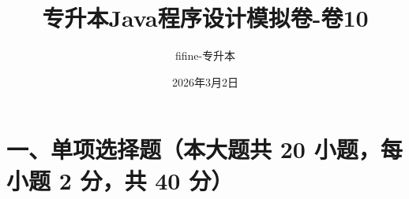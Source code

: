 \documentclass[12pt, a4paper]{ctexart}
\title{\textcolor{myblue}{\textbf{专升本Java程序设计模拟卷-卷10}}}
\author{fifine-专升本}
\date{2026年3月2日}
\begin{document}
\maketitle
\thispagestyle{empty}
\newpage


\section*{一、单项选择题（本大题共 20 小题，每小题 2 分，共 40 分）}
\end{document}
